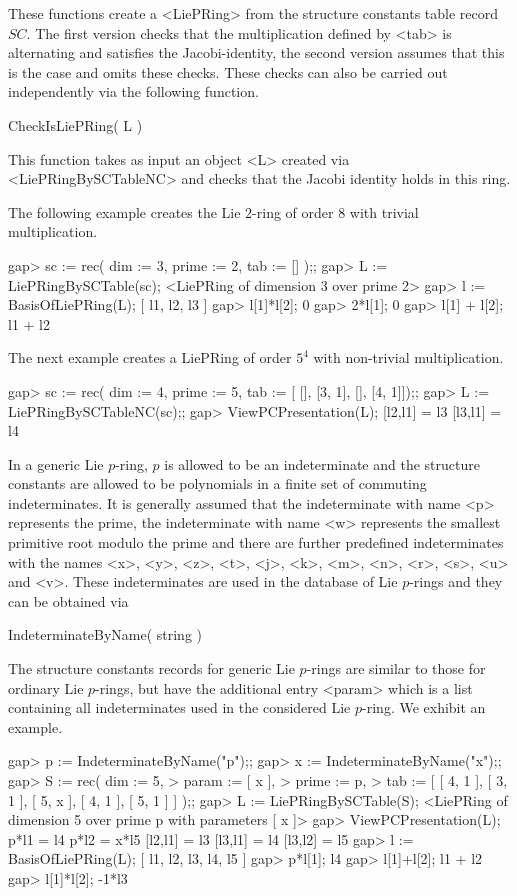 These functions create a <LiePRing> from the structure constants table
record $SC$. The first version checks that the multiplication defined by
<tab> is alternating and satisfies the Jacobi-identity, the second version
assumes that this is the case and omits these checks. These checks can
also be carried out independently via the following function.

\> CheckIsLiePRing( L )

This function takes as input an object <L> created via <LiePRingBySCTableNC>
and checks that the Jacobi identity holds in this ring.

The following example creates the Lie $2$-ring of order $8$ with trivial 
multiplication.  

\beginexample
gap> sc := rec( dim := 3, prime := 2, tab := [] );;
gap> L := LiePRingBySCTable(sc);
<LiePRing of dimension 3 over prime 2>
gap> l := BasisOfLiePRing(L);
[ l1, l2, l3 ]
gap> l[1]*l[2];
0
gap> 2*l[1];
0
gap> l[1] + l[2];
l1 + l2
\endexample

The next example creates a LiePRing of order $5^4$ with non-trivial 
multiplication.

\beginexample
gap> sc := rec( dim := 4, prime := 5, tab := [ [], [3, 1], [], [4, 1]]);;
gap> L := LiePRingBySCTableNC(sc);;
gap> ViewPCPresentation(L);
[l2,l1] = l3
[l3,l1] = l4
\endexample


In a generic Lie $p$-ring, $p$ is allowed to be an indeterminate and 
the structure constants are allowed to be polynomials in a finite set of 
commuting indeterminates. It is generally assumed that the indeterminate
with name <p> represents the prime, the indeterminate with name <w> 
represents the smallest primitive root modulo the prime and there are 
further predefined indeterminates with the names <x>, <y>, <z>, <t>, 
<j>, <k>, <m>, <n>, <r>, <s>, <u> and <v>. These indeterminates are used 
in the database of Lie $p$-rings and they can be obtained via

\> IndeterminateByName( string )

The structure constants records for generic Lie $p$-rings are similar to
those for ordinary Lie $p$-rings, but have the additional entry <param>
which is a list containing all indeterminates used in the considered Lie
$p$-ring. We exhibit an example.

\beginexample
gap> p := IndeterminateByName("p");;
gap> x := IndeterminateByName("x");;
gap> S := rec( dim := 5, 
>              param := [ x ], 
>              prime := p, 
>              tab := [ [ 4, 1 ], [ 3, 1 ], [ 5, x ], [ 4, 1 ], [ 5, 1 ] ] );;
gap> L := LiePRingBySCTable(S);
<LiePRing of dimension 5 over prime p with parameters [ x ]>
gap> ViewPCPresentation(L);
p*l1 = l4
p*l2 = x*l5
[l2,l1] = l3
[l3,l1] = l4
[l3,l2] = l5
gap> l := BasisOfLiePRing(L);
[ l1, l2, l3, l4, l5 ]
gap> p*l[1];
l4
gap> l[1]+l[2];
l1 + l2
gap> l[1]*l[2];
-1*l3
\endexample

